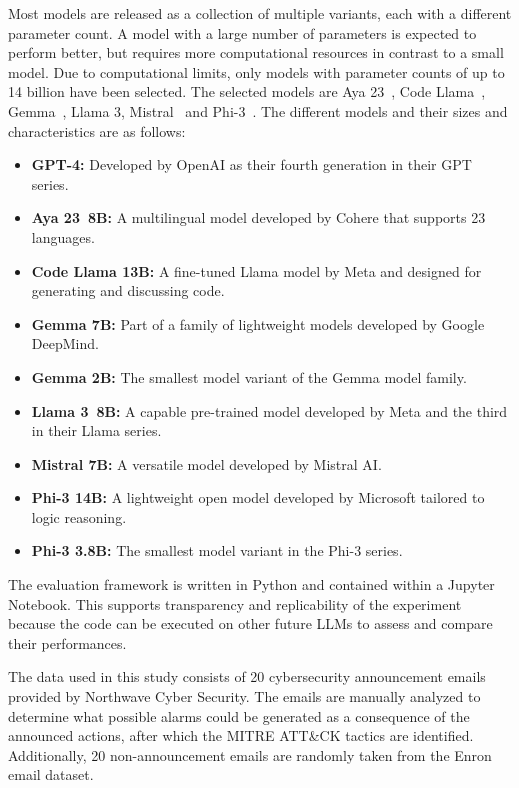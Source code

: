 Most models are released as a collection of multiple variants, each with a different parameter count.
A model with a large number of parameters is expected to perform better, but requires more computational resources
in contrast to a small model.
Due to computational limits, only models with parameter counts of up to 14 billion have been selected.
The selected models are Aya 23\ \citep{aryabumi2024aya}, Code Llama\ \citep{roziere2023code},
Gemma\ \citep{team2024gemma}, Llama 3, Mistral\ \citep{jiang2023mistral} and Phi-3\ \citep{abdin2024phi}.
The different models and their sizes and characteristics are as follows:
\begin{itemize}
    \item \textbf{GPT-4:} Developed by OpenAI as their fourth generation in their GPT series.
    \item \textbf{Aya 23\ 8B:} A multilingual model developed by Cohere that supports 23 languages.
    \item \textbf{Code Llama 13B:} A fine-tuned Llama model by Meta and designed for generating and discussing code.
    \item \textbf{Gemma 7B:} Part of a family of lightweight models developed by Google DeepMind.
    \item \textbf{Gemma 2B:} The smallest model variant of the Gemma model family.
    \item \textbf{Llama 3\ 8B:} A capable pre-trained model developed by Meta and the third in their Llama series.
    \item \textbf{Mistral 7B:} A versatile model developed by Mistral AI\@.
    \item \textbf{Phi-3 14B:} A lightweight open model developed by Microsoft tailored to logic reasoning.
    \item \textbf{Phi-3 3.8B:} The smallest model variant in the Phi-3 series.
\end{itemize}

The evaluation framework is written in Python and contained within a Jupyter Notebook.
This supports transparency and replicability of the experiment because the code can be executed on other future LLMs to
assess and compare their performances.

The data used in this study consists of 20 cybersecurity announcement emails provided by Northwave Cyber Security.
The emails are manually analyzed to determine what possible alarms could be generated as a consequence of the announced
actions, after which the MITRE ATT\&CK tactics are identified.
Additionally, 20 non-announcement emails are randomly taken from the Enron email dataset.

